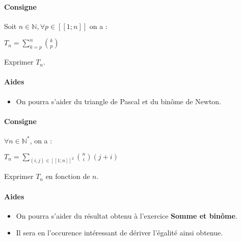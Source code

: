 \documentclass[a4paper]{report}
\newcounter{exnumber}
\begin{document}
				\begin{tcolorbox}[colback=white,colframe=black,title=Exercice n°\arabic{exnumber} - Somme et binôme]
				\paragraph{Consigne}
					Soit $n \in \mathbb{N}, \forall p \in [\![1;n]\!]$ on a :
					\begin{center}
						$T_n = \sum_{k=p}^{n} \binom{k}{p}$
					\end{center}
					Exprimer $T_n$.
					
				\tcblower					
					
				\paragraph{Aides}
					\begin{itemize}
						\item On pourra s'aider du triangle de Pascal et du binôme de Newton.
					\end{itemize}
				\end{tcolorbox}
				\addtocounter{exnumber}{1}
				
				\begin{tcolorbox}[colback=white,colframe=black,title=Exercice n°\arabic{exnumber} - Somme\underline{s} et binôme]
				\paragraph{Consigne}
					$\forall n \in \mathbb{N^*}$, on a :
					\begin{center}
						$T_n = \sum_{(i,j) \in [\![1;n]\!]^2} \binom{n}{i} (j+i)$
					\end{center}
					Exprimer $T_n$ en fonction de $n$.
					
				\tcblower					
					
				\paragraph{Aides}
					\begin{itemize}
						\item On pourra s'aider du résultat obtenu à l'exercice \textbf{Somme et binôme}.
						\item Il sera en l'occurence intéressant de dériver l'égalité ainsi obtenue.
					\end{itemize}
				\end{tcolorbox}
				\addtocounter{exnumber}{1}
			
\end{document}
